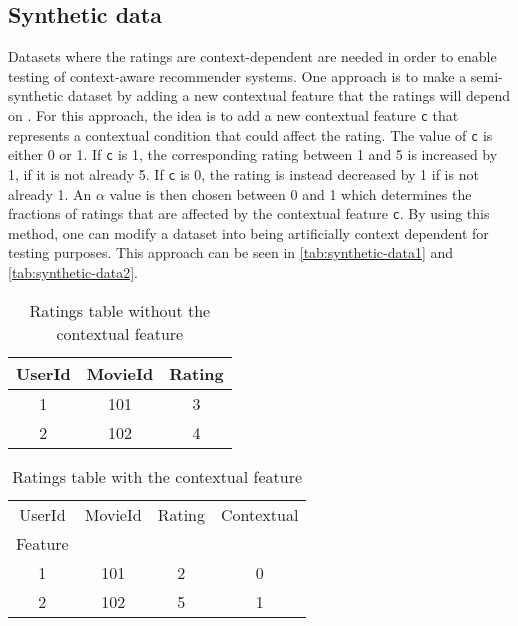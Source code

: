 \subsection{Synthetic data}
Datasets where the ratings are context-dependent are needed in order to enable testing of context-aware recommender systems.
One approach is to make a semi-synthetic dataset by adding a new contextual feature that the ratings will depend on \cite{baltrunasContextItemSplit}.
For this approach, the idea is to add a new contextual feature \texttt{c} that represents a contextual condition that could affect the rating.
The value of \texttt{c} is either 0 or 1. 
If \texttt{c} is 1, the corresponding rating between 1 and 5 is increased by 1, if it is not already 5.
If \texttt{c} is 0, the rating is instead decreased by 1 if is not already 1.
An $\alpha$ value is then chosen between 0 and 1 which determines the fractions of ratings that are affected by the contextual feature \texttt{c}.
By using this method, one can modify a dataset into being artificially context dependent for testing purposes.
This approach can be seen in \autoref{tab:synthetic-data1} and \autoref{tab:synthetic-data2}.
\begin{table*}[hbt!]
    \centering
    \begin{tabular}{|c|c|c|}
    \hline
    UserId & MovieId & Rating \\ [0.5ex] 
    \hline\hline
    1 & 101 & 3 \\
    \hline
    2 & 102 & 4 \\
    \hline
    \end{tabular}
    \caption{Ratings table without the contextual feature}
    \label{tab:synthetic-data1}
\end{table*}
\begin{table*}[hbt!]
    \centering
    \begin{tabular}{|c|c|c|c|} 
    \hline
    UserId & MovieId & Rating & Contextual\\Feature \\ [0.5ex] 
    \hline\hline
    1 & 101 & 2 & 0 \\
    \hline
    2 & 102 & 5 & 1 \\
    \hline
    \end{tabular}
    \caption{Ratings table with the contextual feature}
    \label{tab:synthetic-data2}
\end{table*}
